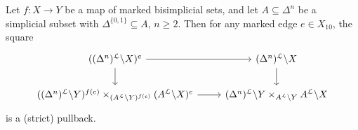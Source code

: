 \documentclass[main.tex]{subfiles}
\begin{document}
\begin{lemma}
  \label{lemma:marked_pullback}
  Let $f\colon X \to Y$ be a map of marked bisimplicial sets, and let $A \subseteq \Delta^{n}$ be a simplicial subset with $\Delta^{\{0, 1\}} \subseteq A$, $n \geq 2$. Then for any marked edge $e \in X_{10}$, the square
  \begin{equation*}
    \begin{tikzcd}
      ((\Delta^{n})^{\mathcal{L}} \backslash X)^{e}
      \arrow[r]
      \arrow[d]
      & (\Delta^{n})^{\mathcal{L}} \backslash X
      \arrow[d]
      \\
      ((\Delta^{n})^{\mathcal{L}} \backslash Y)^{f(e)} \times_{(A^{\mathcal{L}}\backslash Y)^{f(e)}} (A^{\mathcal{L}} \backslash X)^{e}
      \arrow[r]
      & (\Delta^{n})^{\mathcal{L}} \backslash Y \times_{A^{\mathcal{L}}\backslash Y} A^{\mathcal{L}} \backslash X
    \end{tikzcd}
  \end{equation*}
  is a (strict) pullback.
\end{lemma}
\end{document}
